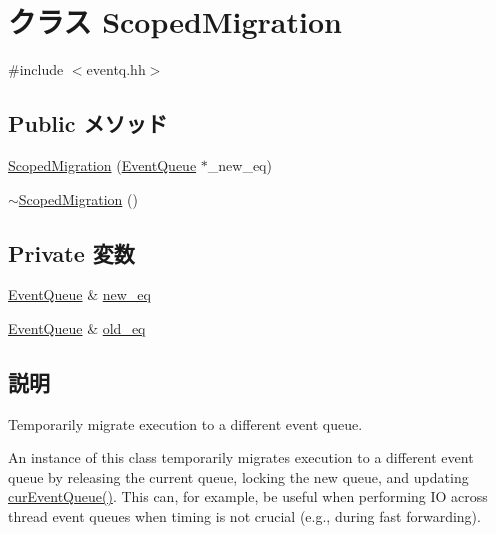 \hypertarget{classEventQueue_1_1ScopedMigration}{
\section{クラス ScopedMigration}
\label{classEventQueue_1_1ScopedMigration}
}


{\ttfamily \#include $<$eventq.hh$>$}\subsection*{Public メソッド}
\begin{DoxyCompactItemize}
\item 
\hyperlink{classEventQueue_1_1ScopedMigration_a278034a612e4c2bcdff92e4ddb95298c}{ScopedMigration} (\hyperlink{classEventQueue}{EventQueue} $\ast$\_\-new\_\-eq)
\item 
\hyperlink{classEventQueue_1_1ScopedMigration_a567f267a37582fed196677493d6eb9fc}{$\sim$ScopedMigration} ()
\end{DoxyCompactItemize}
\subsection*{Private 変数}
\begin{DoxyCompactItemize}
\item 
\hyperlink{classEventQueue}{EventQueue} \& \hyperlink{classEventQueue_1_1ScopedMigration_acffe9fa404c2dfbf6b44e3878126d16e}{new\_\-eq}
\item 
\hyperlink{classEventQueue}{EventQueue} \& \hyperlink{classEventQueue_1_1ScopedMigration_a02c314e5863bbb391a274dbf23923154}{old\_\-eq}
\end{DoxyCompactItemize}


\subsection{説明}
Temporarily migrate execution to a different event queue.

An instance of this class temporarily migrates execution to a different event queue by releasing the current queue, locking the new queue, and updating \hyperlink{eventq_8hh_a64a8603a1af7020a19d30c54152fdcb2}{curEventQueue()}. This can, for example, be useful when performing IO across thread event queues when timing is not crucial (e.g., during fast forwarding). 


